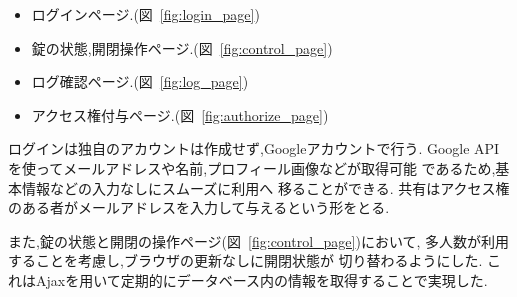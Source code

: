 \begin{itemize}[noitemsep]
  \item ログインページ.(図~\ref{fig:login_page})
  \item 錠の状態,開閉操作ページ.(図~\ref{fig:control_page})
  \item ログ確認ページ.(図~\ref{fig:log_page})
  \item アクセス権付与ページ.(図~\ref{fig:authorize_page})
\end{itemize}

ログインは独自のアカウントは作成せず,Googleアカウントで行う.
Google APIを使ってメールアドレスや名前,プロフィール画像などが取得可能
であるため,基本情報などの入力なしにスムーズに利用へ
移ることができる.
共有はアクセス権のある者がメールアドレスを入力して与えるという形をとる.

また,錠の状態と開閉の操作ページ(図~\ref{fig:control_page})において,
多人数が利用することを考慮し,ブラウザの更新なしに開閉状態が
切り替わるようにした.
これはAjaxを用いて定期的にデータベース内の情報を取得することで実現した.

